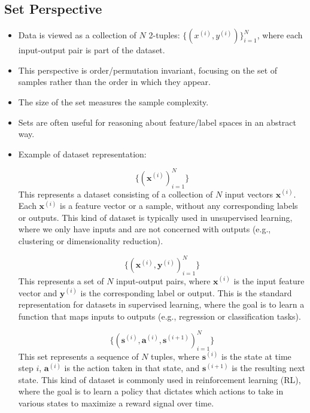 \subsection{Set Perspective}
\begin{itemize}
    \item Data is viewed as a collection of $N$ 2-tuples: $\{(x^{(i)}, y^{(i)})\}_{i=1}^{N}$, where each input-output pair is part of the dataset.
    \item This perspective is order/permutation invariant, focusing on the set of samples rather than the order in which they appear.
    \item The size of the set measures the sample complexity.
    \item Sets are often useful for reasoning about feature/label spaces in an abstract way.
    \item Example of dataset representation:


          \[
              \{ (\bm{x}^{(i)})_{i=1}^{N} \}
          \]This represents a dataset consisting of a collection of $N$ input vectors $\bm{x}^{(i)}$. Each $\bm{x}^{(i)}$ is a feature vector or a sample, without any corresponding labels or outputs. This kind of dataset is typically used in unsupervised learning, where we only have inputs and are not concerned with outputs (e.g., clustering or dimensionality reduction).


          \[
              \{ (\bm{x}^{(i)}, \bm{y}^{(i)})_{i=1}^{N} \}
          \]This represents a set of $N$ input-output pairs, where $\bm{x}^{(i)}$ is the input feature vector and $\bm{y}^{(i)}$ is the corresponding label or output. This is the standard representation for datasets in supervised learning, where the goal is to learn a function that maps inputs to outputs (e.g., regression or classification tasks).


          \[
              \{ (\bm{s}^{(i)}, \bm{a}^{(i)}, \bm{s}^{(i+1)})_{i=1}^{N} \}
          \]This set represents a sequence of $N$ tuples, where $\bm{s}^{(i)}$ is the state at time step $i$, $\bm{a}^{(i)}$ is the action taken in that state, and $\bm{s}^{(i+1)}$ is the resulting next state. This kind of dataset is commonly used in reinforcement learning (RL), where the goal is to learn a policy that dictates which actions to take in various states to maximize a reward signal over time.



\end{itemize}


